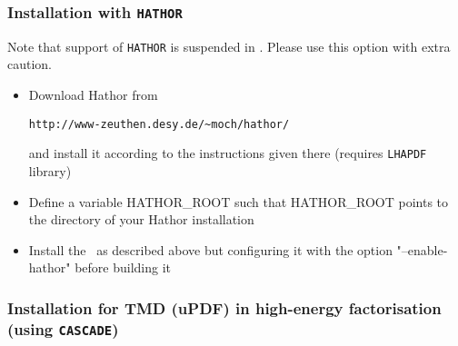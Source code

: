 \subsubsection{Installation with {\tt HATHOR}}
 Note that support of {\tt HATHOR} is suspended in {\fitter}. Please use
 this option with extra caution.
 \begin{itemize}
  \item Download Hathor from 
\begin{verbatim}
http://www-zeuthen.desy.de/~moch/hathor/
\end{verbatim}
     and install it according to the instructions given there
     (requires \verb'LHAPDF' library)

  \item Define a variable HATHOR\_ROOT  such that HATHOR\_ROOT  points to the
     directory of your Hathor installation

  \item Install the \fitter\ as described above but configuring it
     with the option "--enable-hathor" before building it
 \end{itemize}


\subsubsection{Installation for TMD (uPDF) in high-energy factorisation (using  {\tt CASCADE})}

